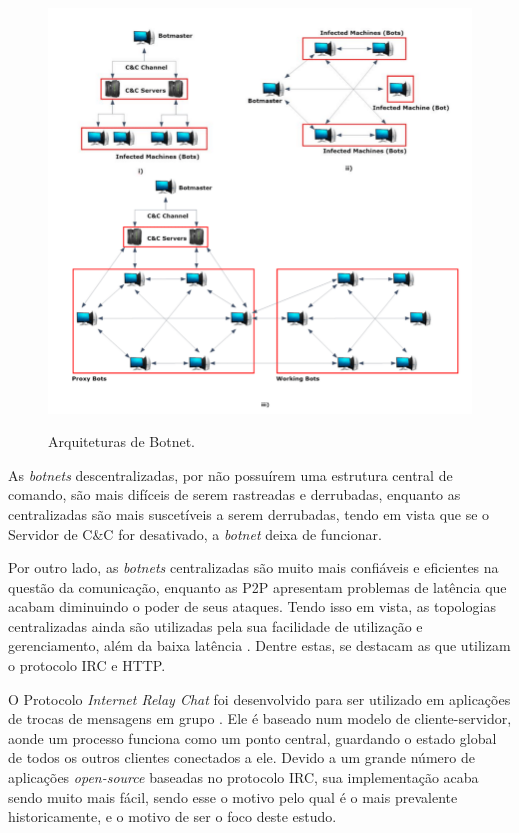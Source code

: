 \begin{figure}[h]
\caption{\small Arquiteturas de Botnet.}
\centering
\includegraphics[scale=0.25]{figs/topologias.png}
\label{f.topologias}
\end{figure}

As \textit{botnets} descentralizadas, por não possuírem uma estrutura central de comando, são mais difíceis de serem rastreadas e derrubadas, enquanto as centralizadas são mais suscetíveis a serem derrubadas, tendo em vista que se o Servidor de C\&C for desativado, a \textit{botnet} deixa de funcionar. \cite{feily2009survey}

Por outro lado, as \textit{botnets} centralizadas são muito mais confiáveis e eficientes na questão da comunicação, enquanto as P2P apresentam problemas de latência que acabam diminuindo o poder de seus ataques. Tendo isso em vista, as topologias centralizadas ainda são utilizadas pela sua facilidade de utilização e gerenciamento, além da baixa latência \cite{12d2f5d1eba245f7bc2acc7487941bd7}. Dentre estas, se destacam as que utilizam o protocolo IRC e HTTP.

O Protocolo \textit{Internet Relay Chat} foi desenvolvido para ser utilizado em aplicações de trocas de mensagens em grupo \cite{oikarinen1993internet}. Ele é baseado num modelo de cliente-servidor, aonde um processo funciona como um ponto central, guardando o estado global de todos os outros clientes conectados a ele. Devido a um grande número de aplicações \textit{open-source} baseadas no protocolo IRC, sua implementação acaba sendo muito mais fácil, sendo esse o motivo pelo qual é o mais prevalente historicamente, e o motivo de ser o foco deste estudo. \cite{abu2006multifaceted}

